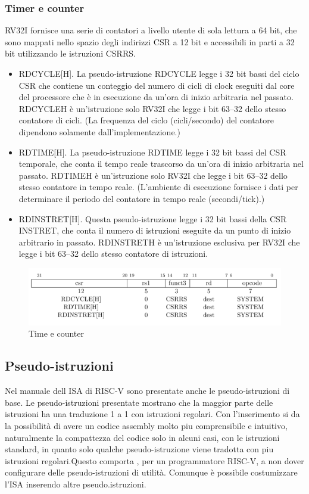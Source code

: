 \documentclass[12pt,a4paper]{report}
\begin{document}
\subsubsection{Timer e counter}
RV32I fornisce una serie di contatori a livello utente di sola lettura a 64 bit, che sono mappati nello spazio degli indirizzi CSR a 12 bit e accessibili in parti a 32 bit utilizzando le istruzioni CSRRS.
\begin{itemize}
	\item RDCYCLE[H]. La pseudo-istruzione RDCYCLE legge i 32 bit bassi del ciclo CSR che contiene un conteggio del numero di cicli di clock eseguiti dal core del processore che è in esecuzione da un'ora di inizio arbitraria nel passato. RDCYCLEH è un'istruzione solo RV32I che legge i bit 63–32 dello stesso contatore di cicli. (La frequenza del ciclo (cicli/secondo) del contatore dipendono solamente dall'implementazione.)
	\item RDTIME[H]. La pseudo-istruzione RDTIME legge i 32 bit bassi del CSR temporale, che conta il tempo reale trascorso da un'ora di inizio arbitraria nel passato. RDTIMEH è un'istruzione solo RV32I che legge i bit 63–32 dello stesso contatore in tempo reale. (L'ambiente di esecuzione fornisce i dati per determinare il periodo del contatore in tempo reale (secondi/tick).)
	\item  RDINSTRET[H]. Questa pseudo-istruzione legge i 32 bit bassi della CSR INSTRET, che conta il numero di istruzioni eseguite da un punto di inizio arbitrario in passato. RDINSTRETH è un'istruzione esclusiva per RV32I che legge i bit 63–32 dello stesso contatore di istruzioni.
\end{itemize}

\begin{figure}
	\includegraphics[width = \textwidth]{Istruzioni/Istruction10.png}
	\caption{Time e counter}
	\label{Fig:Istruzioni_TimerCounter}
\end{figure}

\subsection{Pseudo-istruzioni}
Nel manuale dell ISA di RISC-V sono presentate anche le pseudo-istruzioni di base. Le pseudo-istruzioni presentate mostrano che la maggior parte delle istruzioni ha una traduzione 1 a 1 con istruzioni regolari. Con l'inserimento si da la possibilità di avere un codice assembly molto piu comprensibile e intuitivo, naturalmente la compattezza del codice solo in alcuni casi, con le istruzioni standard, in quanto solo qualche pseudo-istruzione viene tradotta con piu istruzioni regolari.Questo comporta , per un programmatore RISC-V, a non dover configurare delle pseudo-istruzioni di utilità. Comunque è possibile costumizzare l'ISA inserendo altre pseudo.istruzioni.
\end{document}

